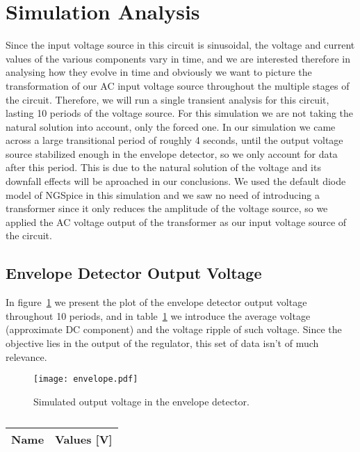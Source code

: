\newpage
\section{Simulation Analysis}
\label{sec:simulation}
Since the input voltage source in this circuit is sinusoidal, the voltage and current values of the various components vary in time, and we are interested therefore in analysing how they evolve in time and obviously we want to picture the transformation of our AC input voltage source throughout the multiple stages of the circuit. Therefore, we will run a single transient analysis for this circuit, lasting 10 periods of the voltage source. For this simulation we are not taking the natural solution into account, only the forced one. In our simulation we came across a large transitional period of roughly 4 seconds, until the output voltage source stabilized enough in the envelope detector, so we only account for data after this period. This is due to the natural solution of the voltage and its downfall effects will be aproached in our conclusions. We used the default diode model of NGSpice in this simulation and we saw no need of introducing a transformer since it only reduces the amplitude of the voltage source, so we applied the AC voltage output of the transformer as our input voltage source of the circuit.
\subsection{Envelope Detector Output Voltage}
In figure~\ref{fig:envelope} we present the plot of the envelope detector output voltage throughout 10 periods, and in table~\ref{tab:envelope} we introduce the average voltage (approximate DC component) and the voltage ripple of such voltage. Since the objective lies in the output of the regulator, this set of data isn't of much relevance.

\begin{figure}[!h] \centering
\texttt{[image: envelope.pdf]}
\caption{Simulated output voltage in the envelope detector.}
\label{fig:envelope}
\end{figure}

\begin{table}[h]
  \centering
  \begin{tabular}{|l|r|}
    \hline    
    {\bf Name} & {\bf Values [V]} \\ \hline
     
  \end{tabular}
  \caption{}
  \label{tab:envelope}
\end{table}

